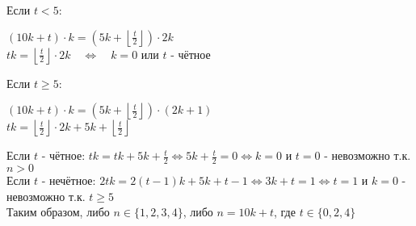 \documentclass{article}
\begin{document}
 	Если $t < 5$: \\
 	\begin{center}
 	$\left(10k+t\right)\cdot k = \left( 5k + \left\lfloor \frac{t}{2} \right\rfloor \right) \cdot 2k $ \\
 	$tk = \left\lfloor \frac{t}{2} \right\rfloor \cdot 2k \quad \Leftrightarrow \quad k = 0$ или $t$ - чётное \\
	\end{center}
	Если $t \geq 5$: \\
	\begin{center}
 	$\left(10k+t\right)\cdot k = \left( 5k + \left\lfloor \frac{t}{2} \right\rfloor \right) \cdot \left(2k+1\right) $ \\
	$tk =\left\lfloor \frac{t}{2} \right\rfloor\cdot 2k + 5k + \left\lfloor \frac{t}{2} \right\rfloor $ \\
	\end{center}
	Если $t$ - чётное: $tk = tk + 5k + \frac{t}{2} \Leftrightarrow 5k + \frac{t}{2} = 0 \Leftrightarrow k=0$ и $t=0$ - невозможно т.к. $n > 0$\\
	Если $t$ - нечётное: $2tk = 2(t-1)k + 5k + t-1 \Leftrightarrow 3k + t = 1 \Leftrightarrow t=1$ и $k=0$ - невозможно т.к. $t \geq 5$ \\
	Таким образом, либо $n \in \lbrace 1, 2, 3, 4\rbrace$, либо $n = 10k + t$, где $t \in \lbrace 0, 2, 4\rbrace$
	
\end{document}
